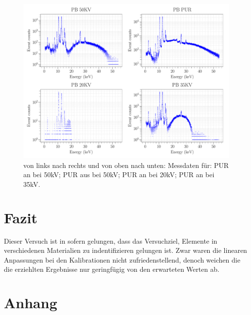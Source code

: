 \documentclass[a4paper,14pt]{article}
\begin{document}
\begin{figure}[H]
\centering
\includegraphics[scale=0.25]{../Figures/XRay-comparison.pdf}
\caption{von links nach rechts und von oben nach unten: Messdaten für: PUR an bei 50kV; PUR aus bei 50kV; PUR an bei 20kV; PUR an bei 35kV.}
\label{XRay-comparison}
\end{figure}


\section{Fazit}
Dieser Versuch ist in sofern gelungen, dass das Versuchziel, Elemente in verschiedenen Materialien zu indentifizieren gelungen ist.
Zwar waren die linearen Anpassungen bei den Kalibrationen nicht zufriedenstellend, denoch weichen die die erziehlten Ergebnisse nur geringfügig von den erwarteten Werten ab.

\section{Anhang}


	
\end{document}
